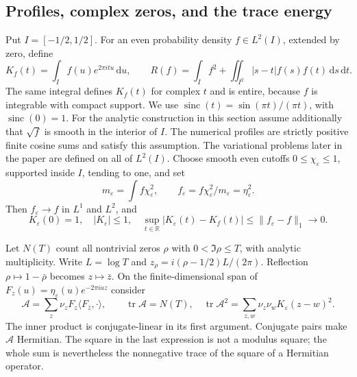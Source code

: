 \documentclass[11pt,reqno]{amsart}
\numberwithin{equation}{section}
\newcommand{\R}{\mathbb R}
\newcommand{\tr}{\operatorname{tr}}
\newcommand{\sinc}{\operatorname{sinc}}
\newcommand{\dd}{\,\mathrm d}
\begin{document}
\subsection{Profiles, complex zeros, and the trace energy}

Put $I=[-1/2,1/2]$. For an even probability density $f\in L^2(I)$,
extended by zero, define
\begin{equation}
 K_f(t)=\int_I f(u)e^{2\pi itu}\dd u,\qquad
 R(f)=\int_I f^2+\iint_{I^2}|s-t|f(s)f(t)\dd s\dd t.
 \label{eq:normalization}
\end{equation}
The same integral defines $K_f(t)$ for complex $t$ and is entire,
because $f$ is integrable with compact support.
We use $\sinc(t)=\sin(\pi t)/(\pi t)$, with $\sinc(0)=1$.
For the analytic construction in this section assume additionally that
$\sqrt f$ is smooth in the interior of $I$. The numerical profiles are
strictly positive finite cosine sums and satisfy this assumption. The
variational problems later in the paper are defined on all of $L^2(I)$.
Choose smooth even cutoffs $0\le\chi_\varepsilon\le1$, supported inside
$I$, tending to one, and set
\[
 m_\varepsilon=\int f\chi_\varepsilon^2,\qquad
 f_\varepsilon=f\chi_\varepsilon^2/m_\varepsilon
 =\eta_\varepsilon^2.
\]
Then $f_\varepsilon\to f$ in $L^1$ and $L^2$, and
\begin{equation}
 K_\varepsilon(0)=1,\quad |K_\varepsilon|\le1,\quad
 \sup_{t\in\R}|K_\varepsilon(t)-K_f(t)|
 \le\|f_\varepsilon-f\|_1\longrightarrow0.
 \label{eq:smoothing}
\end{equation}

Let $N(T)$ count all nontrivial zeros $\rho$ with
$0<\Im\rho\le T$, with analytic multiplicity. Write $L=\log T$ and
$z_\rho=i(\rho-1/2)L/(2\pi)$. Reflection
$\rho\mapsto1-\bar\rho$ becomes $z\mapsto\bar z$.
On the finite-dimensional span of
$F_z(u)=\eta_\varepsilon(u)e^{-2\pi iuz}$ consider
\begin{equation}
 \mathcal A=\sum_z\nu_zF_z\langle F_{\bar z},\cdot\rangle,
 \qquad
 \tr\mathcal A=N(T),\quad
 \tr\mathcal A^2=\sum_{z,w}\nu_z\nu_w K_\varepsilon(z-w)^2.
 \label{eq:operator}
\end{equation}
The inner product is conjugate-linear in its first argument. Conjugate
pairs make $\mathcal A$ Hermitian. The square in the last expression is
not a modulus square; the whole sum is nevertheless the nonnegative
trace of the square of a Hermitian operator.
\end{document}

